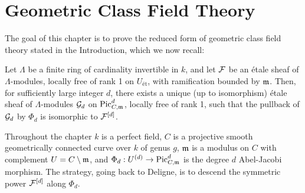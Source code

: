 
\chapter{Geometric Class Field Theory}\label{section:gcft}


The goal of this chapter is to prove the reduced form of geometric class
field theory stated in the Introduction, which we now recall:

\begin{theorem}\label{thm:GCFT_reduced}
    Let $\Lambda$ be a finite ring of cardinality invertible in $k$, and let $\cF$ be an \'etale sheaf of $\Lambda$-modules, locally free of rank 1 on $U_{\text{\'et}}$, with ramification bounded by $\mdls$.
    Then, for sufficiently large integer $d$, there exists a unique (up to isomorphism) \'etale sheaf of $\Lambda$-modules $\cG_d$ on $\PicCm[d]$, locally free of rank 1, such that the pullback of $\cG_d$ by $\Phi_d$ is isomorphic to $\cF^{[d]}$.
\end{theorem}

Throughout the chapter $k$ is a perfect field, $C$ is a projective smooth
geometrically connected curve over $k$ of genus $g$, $\mdls$ is a modulus on
$C$ with complement $U = C \setminus \mdls$, and $\Phi_d : U^{(d)} \to
\PicCm[d]$ is the degree $d$ Abel-Jacobi morphism. The strategy, going back
to Deligne, is to descend the symmetric power $\cF^{[d]}$ along $\Phi_d$.


